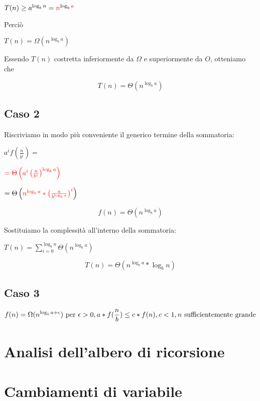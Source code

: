 $T(n) \geq a^{\log_b{n}} = \textcolor{red}{n}^{\log_b{\textcolor{red}{a}}}$

Perciò 

$T(n) = \Omega(n^{\log_b{a}})$

Essendo $T(n)$ costretta inferiormente da $\Omega$ e superiormente da $O$, otteniamo che

\begin{equation}
T(n) = \Theta(n^{\log_b{a}})
\end{equation}

\subsection{Caso 2}

Riscriviamo in modo più conveniente il generico termine della sommatoria:

$a^if\left(\frac{n}{b^i}\right)=$

$\textcolor{red}{=\Theta\left(a^i\left(\frac{n}{b^i}\right)^{\log_b{a}}\right)}$

$=\Theta\left(\textcolor{red}{n^{\log_b{a}} * \left( \frac{a}{b^{\log_b{a}}} \right)^i} \right)$

\begin{equation}
f(n) = \Theta(n^{\log_b{a}})
\end{equation}

Sostituiamo la complessità all'interno della sommatoria:

$T(n) = \sum_{i=0}^{\log_b{n}}{\Theta(n^{\log_b{a}})}$

\begin{equation}
T(n) = \Theta(n^{\log_b{a}}*\log_b{n})
\end{equation}

\subsection{Caso 3}

\begin{equation}
f(n) = \Omega(n^{\log_b{a} + \epsilon})  \mbox{ per } \epsilon > 0, \\ 
a*f(\frac{n}{b}) \leq c*f(n), \\ 
c < 1, \\
n \mbox{ sufficientemente grande}
\end{equation}

\section{Analisi dell'albero di ricorsione}


\section{Cambiamenti di variabile}

